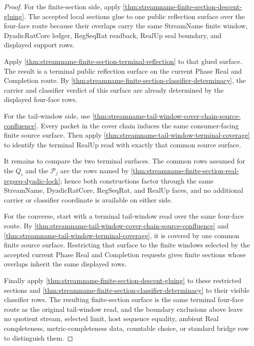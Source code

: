 \begin{proof}
For the finite-section side, apply
\autoref{thm:streamname-finite-section-descent-gluing}. The accepted local
sections glue to one public reflection surface over the four-face route because
their overlaps carry the same StreamName finite window, DyadicRatCore ledger,
RegSeqRat readback, RealUp seal boundary, and displayed support rows.

Apply \autoref{thm:streamname-finite-section-terminal-reflection} to that
glued surface. The result is a terminal public reflection surface on the
current Phase Real and Completion route. By
\autoref{thm:streamname-finite-section-classifier-determinacy}, the carrier and
classifier verdict of this surface are already determined by the displayed
four-face rows.

For the tail-window side, use
\autoref{thm:streamname-tail-window-cover-chain-source-confluence}. Every
packet in the cover chain induces the same consumer-facing finite source
surface. Then apply \autoref{thm:streamname-tail-window-terminal-coverage} to
identify the terminal RealUp read with exactly that common source surface.

It remains to compare the two terminal surfaces. The common rows assumed for
the $Q_i$ and the $\mathcal P_j$ are the rows named by
\autoref{thm:streamname-finite-section-real-regseq-dyadic-lock}; hence both
constructions factor through the same StreamName, DyadicRatCore, RegSeqRat,
and RealUp faces, and no additional carrier or classifier coordinate is
available on either side.

For the converse, start with a terminal tail-window read over the same
four-face route. By
\autoref{thm:streamname-tail-window-cover-chain-source-confluence} and
\autoref{thm:streamname-tail-window-terminal-coverage}, it is covered by one
common finite source surface. Restricting that surface to the finite windows
selected by the accepted current Phase Real and Completion requests gives
finite sections whose overlaps inherit the same displayed rows.

Finally apply \autoref{thm:streamname-finite-section-descent-gluing} to these
restricted sections and
\autoref{thm:streamname-finite-section-classifier-determinacy} to their visible
classifier rows. The resulting finite-section surface is the same terminal
four-face route as the original tail-window read, and the boundary exclusions
above leave no quotient stream, selected limit, host sequence equality,
ambient Real completeness, metric-completeness data, countable choice, or
standard bridge row to distinguish them.
\end{proof}

